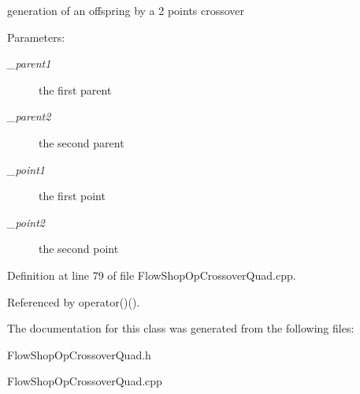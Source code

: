 generation of an offspring by a 2 points crossover 

\begin{Desc}
\item[Parameters:]
\begin{description}
\item[{\em \_\-parent1}]the first parent \item[{\em \_\-parent2}]the second parent \item[{\em \_\-point1}]the first point \item[{\em \_\-point2}]the second point \end{description}
\end{Desc}


Definition at line 79 of file Flow\-Shop\-Op\-Crossover\-Quad.cpp.

Referenced by operator()().

The documentation for this class was generated from the following files:\begin{CompactItemize}
\item 
Flow\-Shop\-Op\-Crossover\-Quad.h\item 
Flow\-Shop\-Op\-Crossover\-Quad.cpp\end{CompactItemize}
